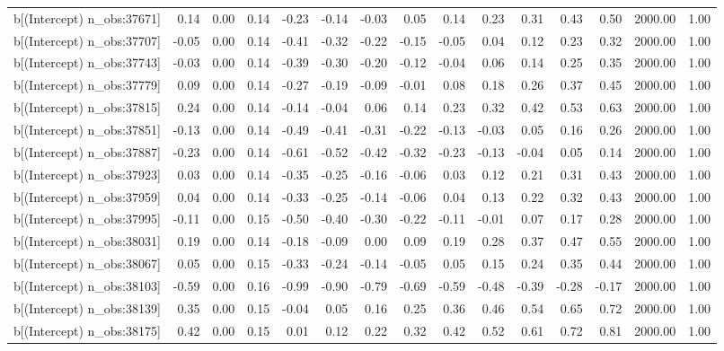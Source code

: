 \begin{table}[ht]
\begin{tabular}{rrrrrrrrrrrrrrr}
  b[(Intercept) n\_obs:37671] & 0.14 & 0.00 & 0.14 & -0.23 & -0.14 & -0.03 & 0.05 & 0.14 & 0.23 & 0.31 & 0.43 & 0.50 & 2000.00 & 1.00 \\ 
  b[(Intercept) n\_obs:37707] & -0.05 & 0.00 & 0.14 & -0.41 & -0.32 & -0.22 & -0.15 & -0.05 & 0.04 & 0.12 & 0.23 & 0.32 & 2000.00 & 1.00 \\ 
  b[(Intercept) n\_obs:37743] & -0.03 & 0.00 & 0.14 & -0.39 & -0.30 & -0.20 & -0.12 & -0.04 & 0.06 & 0.14 & 0.25 & 0.35 & 2000.00 & 1.00 \\ 
  b[(Intercept) n\_obs:37779] & 0.09 & 0.00 & 0.14 & -0.27 & -0.19 & -0.09 & -0.01 & 0.08 & 0.18 & 0.26 & 0.37 & 0.45 & 2000.00 & 1.00 \\ 
  b[(Intercept) n\_obs:37815] & 0.24 & 0.00 & 0.14 & -0.14 & -0.04 & 0.06 & 0.14 & 0.23 & 0.32 & 0.42 & 0.53 & 0.63 & 2000.00 & 1.00 \\ 
  b[(Intercept) n\_obs:37851] & -0.13 & 0.00 & 0.14 & -0.49 & -0.41 & -0.31 & -0.22 & -0.13 & -0.03 & 0.05 & 0.16 & 0.26 & 2000.00 & 1.00 \\ 
  b[(Intercept) n\_obs:37887] & -0.23 & 0.00 & 0.14 & -0.61 & -0.52 & -0.42 & -0.32 & -0.23 & -0.13 & -0.04 & 0.05 & 0.14 & 2000.00 & 1.00 \\ 
  b[(Intercept) n\_obs:37923] & 0.03 & 0.00 & 0.14 & -0.35 & -0.25 & -0.16 & -0.06 & 0.03 & 0.12 & 0.21 & 0.31 & 0.43 & 2000.00 & 1.00 \\ 
  b[(Intercept) n\_obs:37959] & 0.04 & 0.00 & 0.14 & -0.33 & -0.25 & -0.14 & -0.06 & 0.04 & 0.13 & 0.22 & 0.32 & 0.43 & 2000.00 & 1.00 \\ 
  b[(Intercept) n\_obs:37995] & -0.11 & 0.00 & 0.15 & -0.50 & -0.40 & -0.30 & -0.22 & -0.11 & -0.01 & 0.07 & 0.17 & 0.28 & 2000.00 & 1.00 \\ 
  b[(Intercept) n\_obs:38031] & 0.19 & 0.00 & 0.14 & -0.18 & -0.09 & 0.00 & 0.09 & 0.19 & 0.28 & 0.37 & 0.47 & 0.55 & 2000.00 & 1.00 \\ 
  b[(Intercept) n\_obs:38067] & 0.05 & 0.00 & 0.15 & -0.33 & -0.24 & -0.14 & -0.05 & 0.05 & 0.15 & 0.24 & 0.35 & 0.44 & 2000.00 & 1.00 \\ 
  b[(Intercept) n\_obs:38103] & -0.59 & 0.00 & 0.16 & -0.99 & -0.90 & -0.79 & -0.69 & -0.59 & -0.48 & -0.39 & -0.28 & -0.17 & 2000.00 & 1.00 \\ 
  b[(Intercept) n\_obs:38139] & 0.35 & 0.00 & 0.15 & -0.04 & 0.05 & 0.16 & 0.25 & 0.36 & 0.46 & 0.54 & 0.65 & 0.72 & 2000.00 & 1.00 \\ 
  b[(Intercept) n\_obs:38175] & 0.42 & 0.00 & 0.15 & 0.01 & 0.12 & 0.22 & 0.32 & 0.42 & 0.52 & 0.61 & 0.72 & 0.81 & 2000.00 & 1.00 \\ 

\end{tabular}
\end{table}
